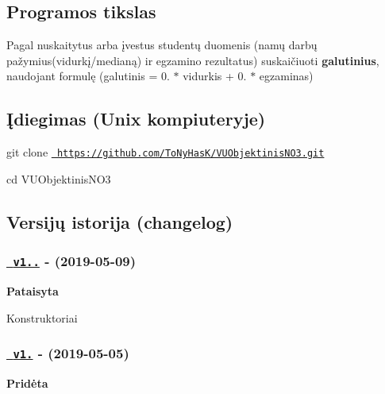 \subsection*{Programos tikslas}


\begin{DoxyItemize}
\item Pagal nuskaitytus arba įvestus studentų duomenis (namų darbų pažymius(vidurkį/medianą) ir egzamino rezultatus) suskaičiuoti {\bfseries{galutinius}}, naudojant formulę (galutinis = 0. $\ast$ vidurkis + 0. $\ast$ egzaminas)
\end{DoxyItemize}

\subsection*{Įdiegimas (Unix kompiuteryje)}


\begin{DoxyItemize}
\item {\ttfamily git clone \href{https://github.com/ToNyHasK/VUObjektinisNO3.git}{\texttt{ https\+://github.\+com/\+To\+Ny\+Has\+K/\+V\+U\+Objektinis\+N\+O3.\+git}}}
\item {\ttfamily cd V\+U\+Objektinis\+N\+O3}
\end{DoxyItemize}

\subsection*{Versijų istorija (changelog)}

\subsubsection*{\href{https://github.com/ToNyHasK/VUObjektinisNO3/releases/tag/v1.5.1}{\texttt{ v1..}} -\/ (2019-\/05-\/09)}

{\bfseries{Pataisyta}}


\begin{DoxyItemize}
\item Konstruktoriai
\end{DoxyItemize}

\subsubsection*{\href{https://github.com/ToNyHasK/VUObjektinisNO3/releases/tag/v1.5}{\texttt{ v1.}} -\/ (2019-\/05-\/05)}

{\bfseries{Pridėta}}



